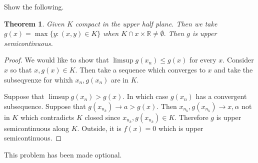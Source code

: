 \documentclass[letter]{article}
\newtheorem{theorem}{Theorem}
\newenvironment{menumerate}{%
  \edef\backupindent{\the\parindent}%
  \enumerate%
  \setlength{\parindent}{\backupindent}%
}{\endenumerate}
\begin{document}
\begin{menumerate}
\begin{menumerate}
     \end{menumerate} 
     \item Show the following.
     \begin{theorem}
        Given $K$ compact in the upper half plane. Then we take $g(x) =  \max\{y: (x,y) \in K\}$ when $K \cap x \times \mathbb{R} \neq \emptyset.$
        Then $g$ is upper semicontinuous.
     \end{theorem}
     \begin{proof}
        We would like to show that $\limsup g(x_n) \leq g(x)$ for every $x.$ Consider $x$ so that $x,g(x) \in K.$ Then take a sequence which converges
        to $x$ and take the subseqyenxe for whixh $x_n,g(x_n)$ are in $K.$  

        Suppose that $\limsup g(x_n) > g(x).$ In which case $g(x_n)$ has a convergent subsequence. Suppose that $g(x_{n_k}) \to a > g(x).$
        Then $x_{n_k}, g(x_{n_k}) \to x, \alpha$ not in $K$ which contradicts $K$ closed since $x_{n_k}, g(x_{n_k}) \in K$.
        Therefore $g$ is upper semicontinuous along $K$. Outside, it is $f(x) = 0$ which is upper semicontinuous.
     \end{proof}
     \item This problem has been made optional.




\end{menumerate}
\end{document}
